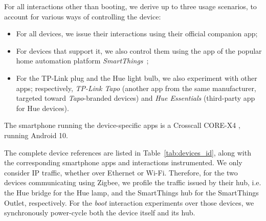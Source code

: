 For all interactions other than booting,
we derive up to three usage scenarios,
to account for various ways of controlling the device:
\begin{itemize}
  \item For all devices, we issue their interactions using their official companion app;
  \item For devices that support it, we also control them using the app of the popular home automation platform \emph{SmartThings}~\cite{smartthings};
  \item For the TP-Link plug and the Hue light bulb, we also experiment with other apps; respectively, \emph{TP-Link Tapo} \cite{app-tapo} (another app from the same manufacturer, targeted toward \emph{Tapo}-branded devices) and \emph{Hue Essentials} \cite{app-hue-essentials} (third-party app for Hue devices).
\end{itemize}

The smartphone running the device-specific apps is a Crosscall CORE-X4 \cite{phone},
running Android 10.



The complete device references are listed in Table~\ref{tab:devices_id},
along with the corresponding smartphone apps and interactions instrumented.
We only consider IP traffic,
whether over Ethernet or Wi-Fi.
Therefore, for the two devices communicating using Zigbee,
we profile the traffic issued by their hub,
i.e. the Hue bridge for the Hue lamp,
and the SmartThings hub for the SmartThings Outlet,
respectively.
For the \emph{boot} interaction experiments over those devices,
we synchronously power-cycle both the device itself and its hub.

